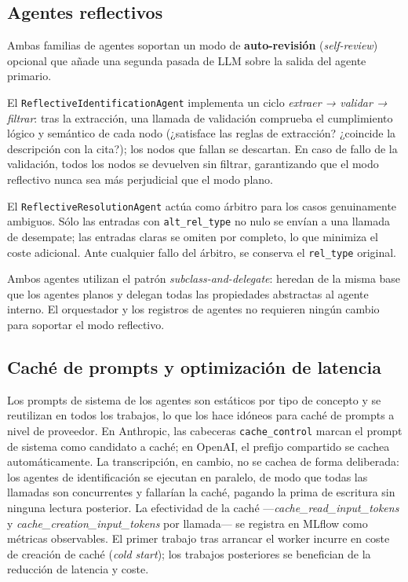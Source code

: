 \subsection{Agentes reflectivos}
\label{anx:agentes-reflectivos}

Ambas familias de agentes soportan un modo de \textbf{auto-revisión} (\textit{self-review})
opcional que añade una segunda pasada de LLM sobre la salida del agente primario.

El \texttt{ReflectiveIdentificationAgent} implementa un ciclo \emph{extraer → validar →
filtrar}: tras la extracción, una llamada de validación comprueba el cumplimiento lógico y
semántico de cada nodo (¿satisface las reglas de extracción? ¿coincide la descripción con la
cita?); los nodos que fallan se descartan. En caso de fallo de la validación, todos los nodos
se devuelven sin filtrar, garantizando que el modo reflectivo nunca sea más perjudicial que el
modo plano.

El \texttt{ReflectiveResolutionAgent} actúa como árbitro para los casos genuinamente ambiguos.
Sólo las entradas con \texttt{alt\_rel\_type} no nulo se envían a una llamada de desempate;
las entradas claras se omiten por completo, lo que minimiza el coste adicional. Ante cualquier
fallo del árbitro, se conserva el \texttt{rel\_type} original.

Ambos agentes utilizan el patrón \textit{subclass-and-delegate}: heredan de la misma base que
los agentes planos y delegan todas las propiedades abstractas al agente interno. El orquestador
y los registros de agentes no requieren ningún cambio para soportar el modo reflectivo.

\subsection{Caché de prompts y optimización de latencia}
\label{anx:cache-prompts}

Los prompts de sistema de los agentes son estáticos por tipo de concepto y se reutilizan en
todos los trabajos, lo que los hace idóneos para caché de prompts a nivel de proveedor. En
Anthropic, las cabeceras \texttt{cache\_control} marcan el prompt de sistema como candidato a
caché; en OpenAI, el prefijo compartido se cachea automáticamente. La transcripción, en cambio,
no se cachea de forma deliberada: los agentes de identificación se ejecutan en paralelo, de modo
que todas las llamadas son concurrentes y fallarían la caché, pagando la prima de escritura sin
ninguna lectura posterior. La efectividad de la caché
—\textit{cache\_read\_input\_tokens} y \textit{cache\_creation\_input\_tokens} por llamada— se
registra en MLflow como métricas observables. El primer trabajo tras arrancar el worker incurre
en coste de creación de caché (\textit{cold start}); los trabajos posteriores se benefician de
la reducción de latencia y coste.

